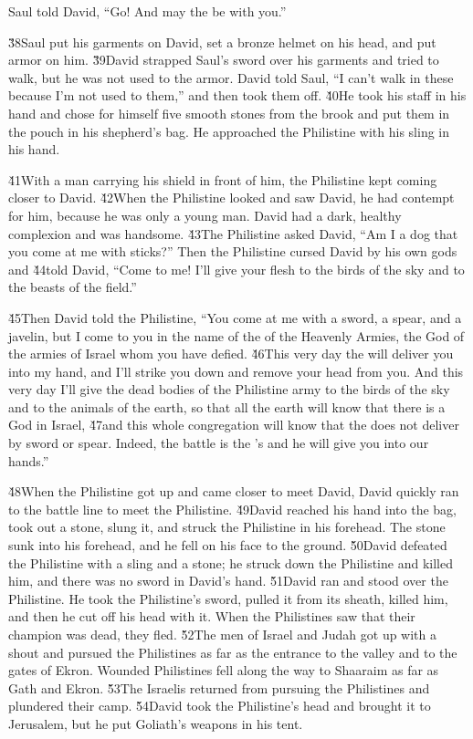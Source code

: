 Saul told David, ``Go! And may the  be with you.''

\v{38}Saul put his garments on David, set a bronze helmet on his head, and put armor on him. \v{39}David strapped Saul's sword over his garments and tried to walk, but he was not used to the armor. David told Saul, ``I can't walk in these because I'm not used to them,'' and then took them off. \v{40}He took his staff in his hand and chose for himself five smooth stones from the brook and put them in the pouch in his shepherd's bag. He approached the Philistine with his sling in his hand.

\v{41}With a man carrying his shield in front of him, the Philistine kept coming closer to David. \v{42}When the Philistine looked and saw David, he had contempt for him, because he was only a young man. David had a dark, healthy complexion and was handsome. \v{43}The Philistine asked David, ``Am I a dog that you come at me with sticks?'' Then the Philistine cursed David by his own gods and \v{44}told David, ``Come to me! I'll give your flesh to the birds of the sky and to the beasts of the field.''

\v{45}Then David told the Philistine, ``You come at me with a sword, a spear, and a javelin, but I come to you in the name of the  of the Heavenly Armies, the God of the armies of Israel whom you have defied. \v{46}This very day the  will deliver you into my hand, and I'll strike you down and remove your head from you. And this very day I'll give the dead bodies of the Philistine army to the birds of the sky and to the animals of the earth, so that all the earth will know that there is a God in Israel, \v{47}and this whole congregation will know that the  does not deliver by sword or spear. Indeed, the battle is the 's and he will give you into our hands.''

\v{48}When the Philistine got up and came closer to meet David, David quickly ran to the battle line to meet the Philistine. \v{49}David reached his hand into the bag, took out a stone, slung it, and struck the Philistine in his forehead. The stone sunk into his forehead, and he fell on his face to the ground. \v{50}David defeated the Philistine with a sling and a stone; he struck down the Philistine and killed him, and there was no sword in David's hand. \v{51}David ran and stood over the Philistine. He took the Philistine's sword, pulled it from its sheath, killed him, and then he cut off his head with it. When the Philistines saw that their champion was dead, they fled. \v{52}The men of Israel and Judah got up with a shout and pursued the Philistines as far as the entrance to the valley and to the gates of Ekron. Wounded Philistines fell along the way to Shaaraim as far as Gath and Ekron. \v{53}The Israelis returned from pursuing the Philistines and plundered their camp. \v{54}David took the Philistine's head and brought it to Jerusalem, but he put Goliath's weapons in his tent.


